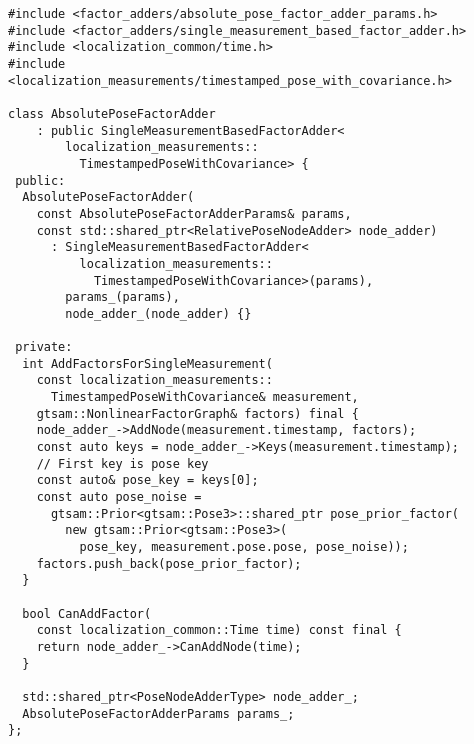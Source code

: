 \begin{verbatim}
#include <factor_adders/absolute_pose_factor_adder_params.h>
#include <factor_adders/single_measurement_based_factor_adder.h>
#include <localization_common/time.h>
#include <localization_measurements/timestamped_pose_with_covariance.h>

class AbsolutePoseFactorAdder
    : public SingleMeasurementBasedFactorAdder<
        localization_measurements::
          TimestampedPoseWithCovariance> {
 public:
  AbsolutePoseFactorAdder(
    const AbsolutePoseFactorAdderParams& params,
    const std::shared_ptr<RelativePoseNodeAdder> node_adder)
      : SingleMeasurementBasedFactorAdder<
          localization_measurements::
            TimestampedPoseWithCovariance>(params),
        params_(params),
        node_adder_(node_adder) {}

 private:
  int AddFactorsForSingleMeasurement(
    const localization_measurements::
      TimestampedPoseWithCovariance& measurement,
    gtsam::NonlinearFactorGraph& factors) final {
    node_adder_->AddNode(measurement.timestamp, factors);
    const auto keys = node_adder_->Keys(measurement.timestamp);
    // First key is pose key
    const auto& pose_key = keys[0];
    const auto pose_noise =
      gtsam::Prior<gtsam::Pose3>::shared_ptr pose_prior_factor(
        new gtsam::Prior<gtsam::Pose3>(
          pose_key, measurement.pose.pose, pose_noise));
    factors.push_back(pose_prior_factor);
  }

  bool CanAddFactor(
    const localization_common::Time time) const final {
    return node_adder_->CanAddNode(time);
  }

  std::shared_ptr<PoseNodeAdderType> node_adder_;
  AbsolutePoseFactorAdderParams params_;
};
\end{verbatim}